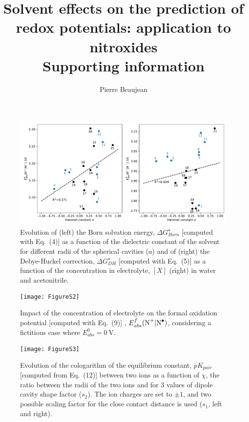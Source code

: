 \documentclass[11pt,a4paper]{article}
\title{Solvent effects on the prediction of redox potentials: application to nitroxides\\ Supporting information}
\author{Pierre Beaujean}
\begin{document}
\maketitle


\renewcommand{\thetable}{S\arabic{table}}
\renewcommand{\thefigure}{S\arabic{figure}}

\begin{figure}[!h]
	\centering
	\includegraphics [width=\linewidth]{FigureS1}
	\caption{Evolution of (left) the Born solvation energy, $\Delta G^\star_{Born}$ [computed with Eq.~(4)] as a function of the dielectric constant of the solvent for different radii of  the spherical cavities ($a$) and of (right) the Debye-Huckel correction, $\Delta G^\star_{DH}$  [computed with Eq.~(5)] as a function of the concentration in electrolyte, $[X]$ (right) in water and acetonitrile.}
\end{figure}

\begin{figure}[!h]
\centering
\texttt{[image: FigureS2]}
\caption{Impact of the concentration of electrolyte on the formal oxidation potential [computed with Eq.~(9)] , $E^f_{abs}(\ce{N+}|\ce{N^.})$, considering a fictitious case where $E^0_{abs} = \SI{0}{\volt}$.}
\end{figure}

\begin{figure}[!h]
\centering
\texttt{[image: FigureS3]}
\caption{Evolution of the cologarithm of the equilibrium constant, $pK_{pair}$ [computed from Eq.~(12)] between two ions as a function of $\chi$, the ratio between the radii of the two ions and for 3 values of dipole cavity shape factor ($s_2$). The ion charges are set to $\pm 1$, and two possible scaling factor for  the close contact distance is used ($s_1$, left and right). }
\end{figure}
\end{document}
